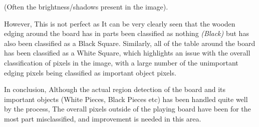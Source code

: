 \documentclass[12pt]{article}
\begin{document}
    (Often the brightness/shadows present in the image).
    \par
    However, This is not perfect as It can be very clearly seen that the wooden edging around the  board has in parts been classified as nothing \emph{(Black)} but has also been classified as a Black Square. Similarly, all of the table
    around the board has been classified as a White Square, which highlights an issue with the overall classification of pixels in the image, with a large number of the unimportant edging pixels being classified as important object pixels.
    \par
    In conclusion, Although the actual region detection of the board and its important objects (White Pieces, Black Pieces etc) has been handled quite well by the process, The overall pixels outside of the playing board have been 
    for the most part misclassified, and improvement is needed in this area.

    \newpage
\end{document}
